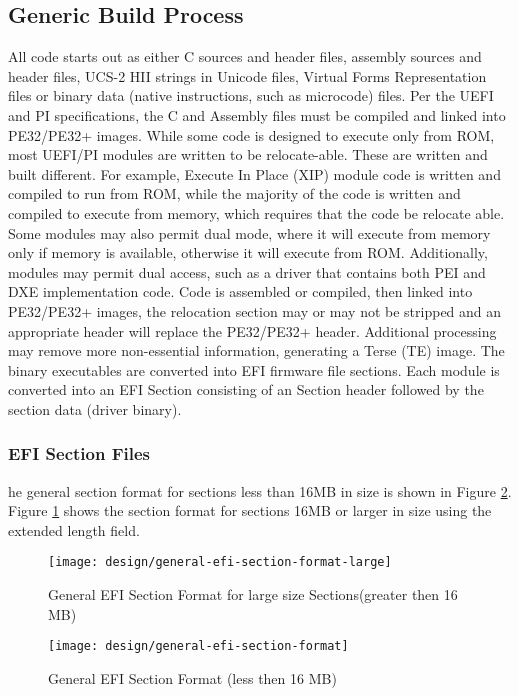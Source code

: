 \subsection{Generic Build Process}
All code starts out as either C sources and header files, assembly sources and header files, UCS-2 HII strings in Unicode files, Virtual Forms Representation files or binary data (native instructions, such as microcode) files. Per the UEFI and PI specifications, the C and Assembly files must be compiled and linked into PE32/PE32+ images.
While some code is designed to execute only from ROM, most UEFI/PI modules are written to be relocate-able. These are written and built different. For example, Execute In Place (XIP) module code is written and compiled to run from ROM, while the majority of the code is written and compiled to execute from memory, which requires that the code be relocate able.
Some modules may also permit dual mode, where it will execute from memory only if memory is available, otherwise it will execute from ROM. Additionally, modules may permit dual access, such as a driver that contains both PEI and DXE implementation code. Code is assembled or compiled, then linked into PE32/PE32+ images, the relocation section may or may not be stripped and an appropriate header will replace the PE32/PE32+ header. Additional processing may remove more non-essential information, generating a Terse (TE) image.
The binary executables are converted into EFI firmware file sections. Each module is converted into an EFI Section consisting of an Section header followed by the section data (driver binary).

\subsubsection{EFI Section Files}
he general section format for sections less than 16MB in size is shown in Figure \ref{fig:design-general-efi-section-format}. Figure \ref{fig:design-general-efi-section-format-large} shows the section format for sections 16MB or larger in size using the extended length field.

\begin{figure}[h]
	\centering
	\texttt{[image: design/general-efi-section-format-large]}
	\caption{General EFI Section Format for large size Sections(greater then 16 MB)}\label{fig:design-general-efi-section-format-large}
\end{figure}


\begin{figure}[h]
	\centering
	\texttt{[image: design/general-efi-section-format]}
	\caption{General EFI Section Format (less then 16 MB)}\label{fig:design-general-efi-section-format}
\end{figure}

